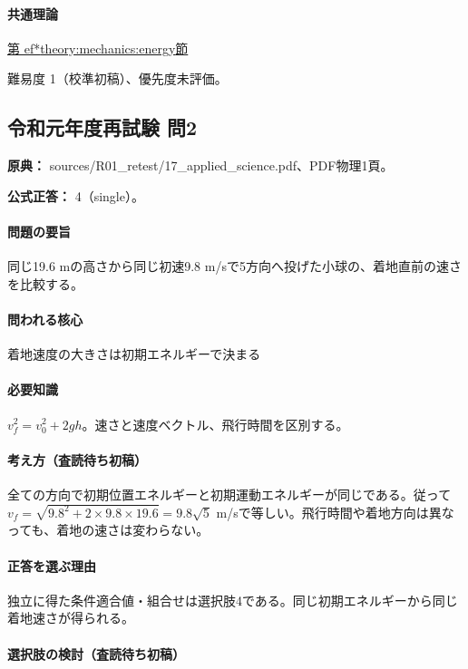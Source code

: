 \paragraph{共通理論} \hyperref[theory:mechanics:energy]{第
ef*{theory:mechanics:energy}節}

\par 難易度 1（校準初稿）、優先度未評価。

\subsection{令和元年度再試験 問2}
\label{q:r01-ret-applied-02}

\noindent\textbf{原典：} sources/R01\_retest/17\_applied\_science.pdf、PDF物理1頁。

\textbf{公式正答：} 4（single）。

\paragraph{問題の要旨} 同じ19.6 mの高さから同じ初速9.8 m/sで5方向へ投げた小球の、着地直前の速さを比較する。

\paragraph{問われる核心} 着地速度の大きさは初期エネルギーで決まる

\paragraph{必要知識} \(v_f^2=v_0^2+2gh\)。速さと速度ベクトル、飛行時間を区別する。

\paragraph{考え方（査読待ち初稿）} 全ての方向で初期位置エネルギーと初期運動エネルギーが同じである。従って\(v_f=\sqrt{9.8^2+2\times9.8\times19.6}=9.8\sqrt5\) m/sで等しい。飛行時間や着地方向は異なっても、着地の速さは変わらない。

\paragraph{正答を選ぶ理由} 独立に得た条件適合値・組合せは選択肢4である。同じ初期エネルギーから同じ着地速さが得られる。

\paragraph{選択肢の検討（査読待ち初稿）}

